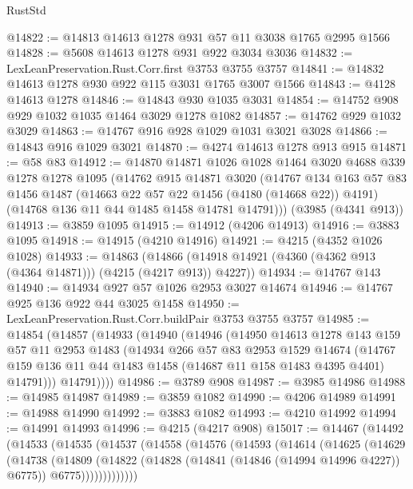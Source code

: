 \begin{lexlean}{RustStd}
\begin{coremodule}
{\begin{coremodule}
{{{{{{{{{{{{{{{{{{{{{{{{{{{{{{{@14822 := @14813 @14613 @1278 @931 @57 @11 @3038 @1765 @2995 @1566
@14828 := @5608 @14613 @1278 @931 @922 @3034 @3036
@14832 := LexLeanPreservation.Rust.Corr.first @3753 @3755 @3757
@14841 := @14832 @14613 @1278 @930 @922 @115 @3031 @1765 @3007 @1566
@14843 := @4128 @14613 @1278
@14846 := @14843 @930 @1035 @3031
@14854 := @14752 @908 @929 @1032 @1035 @1464 @3029 @1278 @1082
@14857 := @14762 @929 @1032 @3029
@14863 := @14767 @916 @928 @1029 @1031 @3021 @3028
@14866 := @14843 @916 @1029 @3021
@14870 := @4274 @14613 @1278 @913 @915
@14871 := @58 @83
@14912 := @14870
    @14871
    @1026
    @1028
    @1464
    @3020
    @4688
    @339
    @1278
    @1278
    @1095
    (@14762
      @915
      @14871
      @3020
      (@14767
        @134
        @163
        @57
        @83
        @1456
        @1487
        (@14663 @22 @57 @22 @1456 (@4180 (@14668 @22)) @4191)
        (@14768 @136 @11 @44 @1485 @1458 @14781 @14791)))
    (@3985 (@4341 @913))
@14913 := @3859 @1095
@14915 := @14912 (@4206 @14913)
@14916 := @3883 @1095
@14918 := @14915 (@4210 @14916)
@14921 := @4215 (@4352 @1026 @1028)
@14933 := @14863
    (@14866 (@14918 @14921 (@4360 (@4362 @913 (@4364 @14871))) (@4215 (@4217 @913)) @4227))
@14934 := @14767 @143
@14940 := @14934 @927 @57 @1026 @2953 @3027 @14674
@14946 := @14767 @925 @136 @922 @44 @3025 @1458
@14950 := LexLeanPreservation.Rust.Corr.buildPair @3753 @3755 @3757
@14985 := @14854
    (@14857
      (@14933
        (@14940
          (@14946
            (@14950
              @14613
              @1278
              @143
              @159
              @57
              @11
              @2953
              @1483
              (@14934
                @266
                @57
                @83
                @2953
                @1529
                @14674
                (@14767 @159 @136 @11 @44 @1483 @1458 (@14687 @11 @158 @1483 @4395 @4401) @14791)))
            @14791))))
@14986 := @3789 @908
@14987 := @3985 @14986
@14988 := @14985 @14987
@14989 := @3859 @1082
@14990 := @4206 @14989
@14991 := @14988 @14990
@14992 := @3883 @1082
@14993 := @4210 @14992
@14994 := @14991 @14993
@14996 := @4215 (@4217 @908)
@15017 := @14467
    (@14492
      (@14533
        (@14535
          (@14537
            (@14558
              (@14576
                (@14593
                  (@14614
                    (@14625
                      (@14629
                        (@14738
                          (@14809
                            (@14822
                              (@14828 (@14841 (@14846 (@14994 @14996 @4227)) @6775))
                              @6775)))))))))))))
}}}}}}}}}}}}}}}}}}}}}}}}}}}}}}}
\end{coremodule}}
\end{coremodule}
\end{lexlean}
